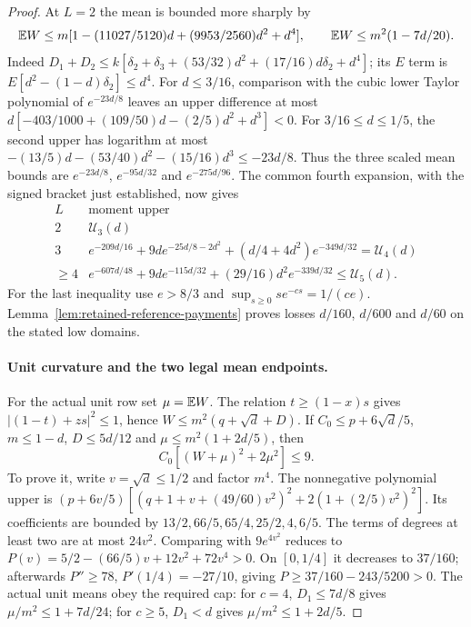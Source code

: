 \begin{proof}
At $L=2$ the mean is bounded more sharply by
\[
 \mathbb E W\le m[1-(11027/5120)d+(9953/2560)d^2+d^4],
 \qquad \mathbb E W\le m^2(1-7d/20).
\]
Indeed $D_1+D_2\le k[\delta_2+\delta_3+(53/32)d^2
+(17/16)d\delta_2+d^4]$; its $E$ term is
$E[d^2-(1-d)\delta_2]\le d^4$.
For $d\le3/16$, comparison with the cubic lower Taylor polynomial
of $e^{-23d/8}$ leaves an upper difference at most
$d[-403/1000+(109/50)d-(2/5)d^2+d^3]<0$.
For $3/16\le d\le1/5$, the second upper has logarithm at most
$-(13/5)d-(53/40)d^2-(15/16)d^3\le-23d/8$.
Thus the three scaled mean bounds are
$e^{-23d/8}$, $e^{-95d/32}$ and $e^{-275d/96}$.
The common fourth expansion, with the signed bracket just established,
now gives
\[
 \begin{array}{c|c}
 L&\text{moment upper}\\\hline
 2&\mathcal U_3(d)\\
 3&e^{-209d/16}+9d e^{-25d/8-2d^2}
       +(d/4+4d^2)e^{-349d/32}=\mathcal U_4(d)\\
 \ge4&e^{-607d/48}+9de^{-115d/32}
       +(29/16)d^2e^{-339d/32}\le\mathcal U_5(d).
 \end{array}
\]
For the last inequality use $e>8/3$ and
$\sup_{s\ge0}s e^{-cs}=1/(ce)$.
Lemma~\ref{lem:retained-reference-payments} proves losses
$d/160$, $d/600$ and $d/60$ on the stated low domains.

\paragraph{Unit curvature and the two legal mean endpoints.}
For the actual unit row set $\mu=\mathbb E W$.
The relation $t\ge(1-x)s$ gives
$|(1-t)+zs|^2\le1$, hence
$W\le m^2(q+\sqrt d+D)$.
If $C_0\le p+6\sqrt d/5$, $m\le1-d$, $D\le5d/12$ and
$\mu\le m^2(1+2d/5)$, then
\begin{equation}\label{eq:Q184:unitnine}
 C_0[(W+\mu)^2+2\mu^2]\le9.
\end{equation}
To prove it, write $v=\sqrt d\le1/2$ and factor $m^4$.
The nonnegative polynomial upper is
$(p+6v/5)[(q+1+v+(49/60)v^2)^2+2(1+(2/5)v^2)^2]$.
Its coefficients are bounded by
$13/2,66/5,65/4,25/2,4,6/5$.
The terms of degrees at least two are at most $24v^2$.
Comparing with $9e^{4v^2}$ reduces to
$P(v)=5/2-(66/5)v+12v^2+72v^4>0$.
On $[0,1/4]$ it decreases to $37/160$; afterwards
$P''\ge78$, $P'(1/4)=-27/10$, giving
$P\ge37/160-243/5200>0$.
The actual unit means obey the required cap: for $c=4$,
$D_1\le7d/8$ gives $\mu/m^2\le1+7d/24$;
for $c\ge5$, $D_1<d$ gives $\mu/m^2\le1+2d/5$.


\end{proof}
